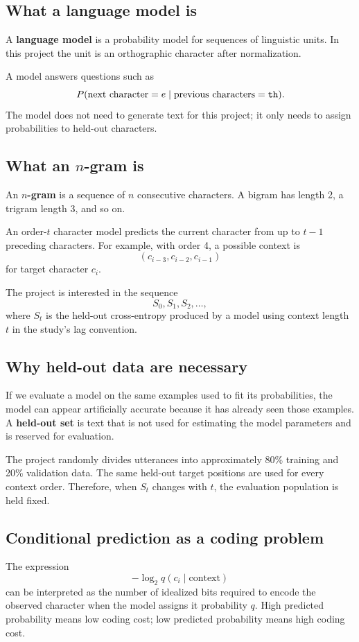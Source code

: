 \documentclass[11pt]{article}
\begin{document}
\subsection{What a language model is}
A \textbf{language model} is a probability model for sequences of linguistic units. In this project the unit is an orthographic character after normalization.

A model answers questions such as
\[
P(\text{next character}=e\mid\text{previous characters}={\tt th}).
\]
The model does not need to generate text for this project; it only needs to assign probabilities to held-out characters.

\subsection{What an $n$-gram is}
An \textbf{$n$-gram} is a sequence of $n$ consecutive characters. A bigram has length 2, a trigram length 3, and so on.

An order-$t$ character model predicts the current character from up to $t-1$ preceding characters. For example, with order 4, a possible context is
\[
(c_{i-3},c_{i-2},c_{i-1})
\]
for target character $c_i$.

The project is interested in the sequence
\[
S_0,S_1,S_2,\ldots,
\]
where $S_t$ is the held-out cross-entropy produced by a model using context length $t$ in the study's lag convention.

\subsection{Why held-out data are necessary}
If we evaluate a model on the same examples used to fit its probabilities, the model can appear artificially accurate because it has already seen those examples. A \textbf{held-out set} is text that is not used for estimating the model parameters and is reserved for evaluation.

The project randomly divides utterances into approximately 80\% training and 20\% validation data. The same held-out target positions are used for every context order. Therefore, when $S_t$ changes with $t$, the evaluation population is held fixed.

\subsection{Conditional prediction as a coding problem}
The expression
\[
-\log_2q(c_i\mid\text{context})
\]
can be interpreted as the number of idealized bits required to encode the observed character when the model assigns it probability $q$. High predicted probability means low coding cost; low predicted probability means high coding cost.
\end{document}
